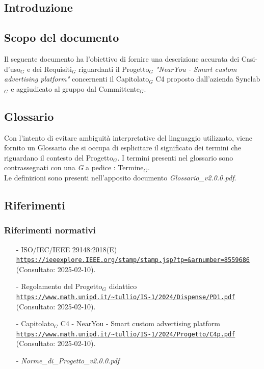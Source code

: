 \documentclass[10pt]{article}
\begin{document}
\newpage
\tableofcontents
\newpage
\listoffigures
\newpage
\listoftables

\newpage
\begin{justify}

\section{Introduzione}
\label{sec:intro}

\subsection{Scopo del documento}

Il seguente documento ha l'obiettivo di fornire una descrizione accurata dei Casi-d'uso$_G$ e dei Requisiti$_G$ riguardanti il Progetto$_G$ \textit{"NearYou - 
Smart custom advertising platform"} concernenti il Capitolato$_G$ C4 proposto dall'azienda Synclab$_G$ e aggiudicato al gruppo dal Committente$_G$.


\subsection{Glossario}
Con l'intento di evitare ambiguità interpretative del linguaggio utilizzato, viene fornito un Glossario che si occupa di esplicitare il significato dei termini che riguardano il contesto del Progetto$_G$. I termini presenti nel glossario sono contrassegnati con una \textit{G} a pedice : Termine$_G$.\\
Le definizioni sono presenti nell'apposito documento \textit{Glossario\_v2.0.0.pdf}.


\subsection{Riferimenti}

\subsubsection{Riferimenti normativi}
\begin{itemize}
    \item[-] ISO/IEC/IEEE 29148:2018(E) \\
    \textcolor{blue}{\texttt{\url{https://ieeexplore.IEEE.org/stamp/stamp.jsp?tp=&arnumber=8559686}}}\\ (Consultato: 2025-02-10).   
    \item[-] Regolamento del Progetto$_G$ didattico  \\
    \textcolor{blue}{\texttt{\url{https://www.math.unipd.it/~tullio/IS-1/2024/Dispense/PD1.pdf}}}\\ (Consultato: 2025-02-10).
    \item[-] Capitolato$_G$ C4 - NearYou - Smart custom advertising platform\\
    \textcolor{blue}{\texttt{\url{https://www.math.unipd.it/~tullio/IS-1/2024/Progetto/C4p.pdf}}}\\ (Consultato: 2025-02-10).
    \item[-] \textit{Norme\_di\_Progetto\_v2.0.0.pdf}
    

\end{itemize}
\end{justify}
\end{document}
